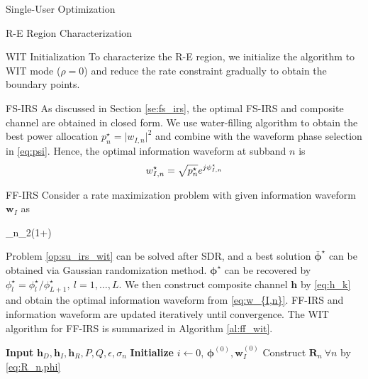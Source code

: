 \documentclass{IEEEtran}
\begin{document}
\begin{section}{Single-User Optimization}
	\begin{subsection}{R-E Region Characterization}
		\begin{subsubsection}{WIT Initialization}
			To characterize the R-E region, we initialize the algorithm to WIT mode ($\rho = 0$) and reduce the rate constraint gradually to obtain the boundary points.
			\begin{paragraph}{FS-IRS}
				As discussed in Section \ref{se:fs_irs}, the optimal FS-IRS and composite channel are obtained in closed form. We use water-filling algorithm to obtain the best power allocation $p_n^\star=\lvert w_{I,n} \rvert^2$ and combine with the waveform phase selection in \ref{eq:psi}. Hence, the optimal information waveform at subband $n$ is
				\begin{equation}\label{eq:w_{I,n}}
					w_{I,n}^\star=\sqrt{p_n^\star}e^{j \psi_{I,n}^\star}
				\end{equation}
			\end{paragraph}
			\begin{paragraph}{FF-IRS}
				Consider a rate maximization problem with given information waveform $\boldsymbol{w}_I$ as
				\begin{maxi!}
					{\boldsymbol{\Phi}}{\sum_{n}{\log_2\left(1+\right)}}{\label{op:su_irs_wit}}{}
				\end{maxi!}
				Problem \ref{op:su_irs_wit} can be solved after SDR, and a best solution $\bar{\boldsymbol{\phi}}^\star$ can be obtained via Gaussian randomization method. $\boldsymbol{\phi}^\star$ can be recovered by $\phi_l^\star=\phi_l^\star/\phi_{L+1}^\star, \ l=1,\dots,L$. We then construct composite channel $\boldsymbol{h}$ by \ref{eq:h_k} and obtain the optimal information waveform from \ref{eq:w_{I,n}}. FF-IRS and information waveform are updated iteratively until convergence. The WIT algorithm for FF-IRS is summarized in Algorithm \ref{al:ff_wit}.
				\begin{algorithm}
					\caption{FF-IRS: WIT Initialization}
					\label{al:ff_wit}
					\begin{algorithmic}[1]
						\State \textbf{Input} $\boldsymbol{h}_D, \boldsymbol{h}_I, \boldsymbol{h}_R, P, Q, \epsilon, \sigma_n$
						\State \textbf{Initialize} $i \gets 0$, $\boldsymbol{\phi}^{(0)},\boldsymbol{w}_I^{(0)}$
						\State Construct $\boldsymbol{R}_n \ \forall n$ by \ref{eq:R_n,phi}

\end{algorithmic}
\end{algorithm}
\end{paragraph}
\end{subsubsection}
\end{subsection}
\end{section}
\end{document}
